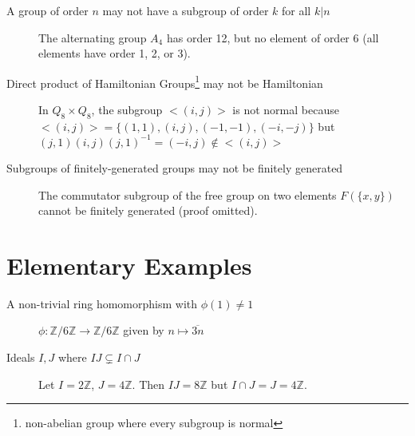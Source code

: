 \documentclass[]{article}
\newcommand{\x}{\times}
\newcommand{\Z}{\mathbb{Z}}
\begin{document}
\begin{description}
\item[A group of order $n$ may not have a subgroup of order $k$ for all $k | n$]
The alternating group $A_4$ has order 12, but no element of order 6 (all
elements have order 1, 2, or 3).

\item[Direct product of Hamiltonian Groups\footnote{non-abelian group where
every subgroup is normal} may not be Hamiltonian]
In $Q_8 \x Q_8$, the subgroup $<(i, j)>$ is not normal because $<(i, j)> = \{(1,
1), (i, j), (-1, -1), (-i, -j) \}$ but $(j, 1)(i, j)(j, 1)^{-1} = (-i, j)
\not\in <(i, j)>$

\item[Subgroups of finitely-generated groups may not be finitely generated]
The commutator subgroup of the free group on two elements $F(\{x, y\})$ cannot
be finitely generated (proof omitted).

\end{description}

\newpage
\section*{Elementary Examples}
\begin{description}
\item[A non-trivial ring homomorphism with $\phi(1) \neq 1$]
$\phi: \Z/6\Z \to \Z/6\Z$ given by $n \mapsto \overline{3n}$

\item[Ideals $I, J$ where $IJ \subsetneq I \cap J$]
Let $I = 2\Z$, $J = 4\Z$. Then $IJ = 8\Z$ but $I \cap J = J = 4\Z$.
\end{description}
\end{document}
